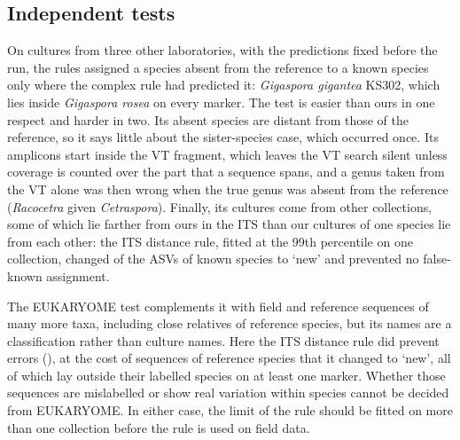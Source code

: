 \documentclass[11pt]{article}
\newcommand{\spn}[1]{\emph{#1}}   %
\begin{document}
\subsection{Independent tests}
On \LgTestCultures{} cultures from three other laboratories, with the predictions fixed before the run, the rules
assigned a species absent from the reference to a known species only where the complex rule had predicted it:
\spn{Gigaspora gigantea} KS302, which lies inside \spn{Gigaspora rosea} on every marker. The test is easier than ours
in one respect and harder in two. Its absent species are distant from those of the reference, so it says little about
the sister-species case, which occurred once. Its amplicons start inside the VT fragment, which leaves the VT search
silent unless coverage is counted over the part that a sequence spans, and a genus taken from the VT alone was then
wrong when the true genus was absent from the reference (\spn{Racocetra} given \spn{Cetraspora}). Finally, its
cultures come from other collections, some of which lie farther from ours in the ITS than our cultures of one species
lie from each other: the ITS distance rule, fitted at the 99th percentile on one collection, changed \LgNSixDemoted{}
of the \LgKnownN{} ASVs of known species to `new' and prevented no false-known assignment.

The EUKARYOME test complements it with field and reference sequences of many more taxa, including close relatives of
reference species, but its names are a classification rather than culture names. Here the ITS distance rule did
prevent errors (\EkFxRulePrevented{}), at the cost of \EkFxRuleCost{} sequences of reference species that it changed
to `new', all of which lay outside their labelled species on at least one marker. Whether those sequences are
mislabelled or show real variation within species cannot be decided from EUKARYOME. In either case, the limit of the
rule should be fitted on more than one collection before the rule is used on field data.
\end{document}
